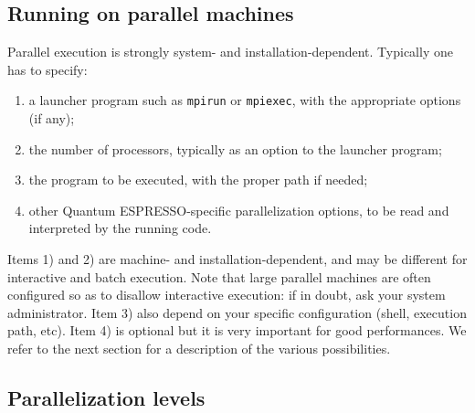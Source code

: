 \documentclass[12pt,a4paper]{article}
\def\qe{{\sc Quantum ESPRESSO}}
\begin{document}
\subsection{Running on parallel machines}

Parallel execution is strongly system- and installation-dependent.
Typically one has to specify:
\begin{enumerate}
\item a launcher program such as \texttt{mpirun} or \texttt{mpiexec},
  with the  appropriate options (if any);
\item the number of processors, typically as an option to the launcher
  program;
\item the program to be executed, with the proper path if needed;
\item other \qe-specific parallelization options, to be
  read and interpreted by the running code.
\end{enumerate}
Items 1) and 2) are machine- and installation-dependent, and may be
different for interactive and batch execution. Note that large
parallel machines are  often configured so as to disallow interactive
execution: if in doubt, ask your system administrator.
Item 3) also depend on your specific configuration (shell, execution path, etc).
Item 4) is optional but it is very important
for good performances. We refer to the next
section for a description of the various
possibilities.

\subsection{Parallelization levels}
\end{document}

